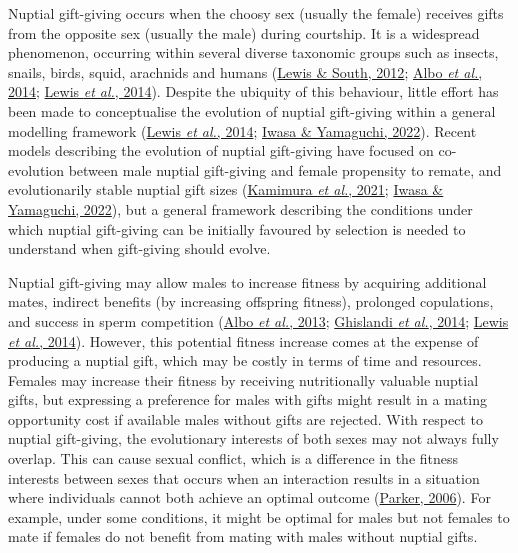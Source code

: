 \documentclass[
]{article}
\begin{document}
Nuptial gift-giving occurs when the choosy sex (usually the female)
receives gifts from the opposite sex (usually the male) during
courtship. It is a widespread phenomenon, occurring within several
diverse taxonomic groups such as insects, snails, birds, squid,
arachnids and humans (\protect\hyperlink{ref-Lewis2012}{Lewis \& South,
2012}; \protect\hyperlink{ref-Albo2014}{Albo \emph{et al.}, 2014};
\protect\hyperlink{ref-Lewis2014}{Lewis \emph{et al.}, 2014}). Despite
the ubiquity of this behaviour, little effort has been made to
conceptualise the evolution of nuptial gift-giving within a general
modelling framework (\protect\hyperlink{ref-Lewis2014}{Lewis \emph{et
al.}, 2014}; \protect\hyperlink{ref-Iwasa2022}{Iwasa \& Yamaguchi,
2022}). Recent models describing the evolution of nuptial gift-giving
have focused on co-evolution between male nuptial gift-giving and female
propensity to remate, and evolutionarily stable nuptial gift sizes
(\protect\hyperlink{ref-Kamimura2021}{Kamimura \emph{et al.}, 2021};
\protect\hyperlink{ref-Iwasa2022}{Iwasa \& Yamaguchi, 2022}), but a
general framework describing the conditions under which nuptial
gift-giving can be initially favoured by selection is needed to
understand when gift-giving should evolve.

Nuptial gift-giving may allow males to increase fitness by acquiring
additional mates, indirect benefits (by increasing offspring fitness),
prolonged copulations, and success in sperm competition
(\protect\hyperlink{ref-Albo2013}{Albo \emph{et al.}, 2013};
\protect\hyperlink{ref-Ghislandi2014}{Ghislandi \emph{et al.}, 2014};
\protect\hyperlink{ref-Lewis2014}{Lewis \emph{et al.}, 2014}). However,
this potential fitness increase comes at the expense of producing a
nuptial gift, which may be costly in terms of time and resources.
Females may increase their fitness by receiving nutritionally valuable
nuptial gifts, but expressing a preference for males with gifts might
result in a mating opportunity cost if available males without gifts are
rejected. With respect to nuptial gift-giving, the evolutionary
interests of both sexes may not always fully overlap. This can cause
sexual conflict, which is a difference in the fitness interests between
sexes that occurs when an interaction results in a situation where
individuals cannot both achieve an optimal outcome
(\protect\hyperlink{ref-Parker2006}{Parker, 2006}). For example, under
some conditions, it might be optimal for males but not females to mate
if females do not benefit from mating with males without nuptial gifts.
\end{document}
